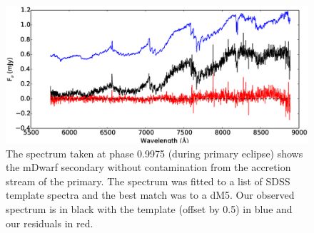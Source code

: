 \documentclass[a4paper,fleqn,usenatbib]{mnras}
\begin{document}
\begin{figure}
\centering
\includegraphics[width=\textwidth]{images/modelfit.eps}
\caption[Caption for spectrum]{The spectrum taken at phase 0.9975 (during primary eclipse) shows the mDwarf secondary without contamination from the accretion stream of the primary. The spectrum was fitted to a list of SDSS template spectra and the best match was to a dM5. Our observed spectrum is in black with the template (offset by 0.5) in blue and our residuals in red. }
\label{fig:sloanfit}
\end{figure}
\end{document}
